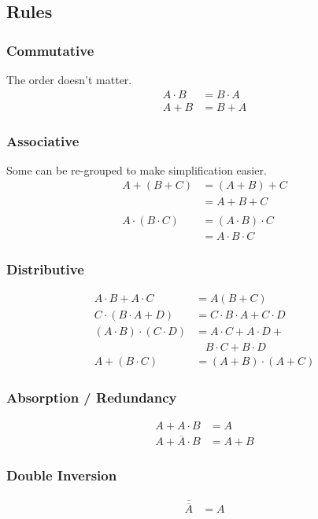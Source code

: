 \documentclass[a4paper,11pt, twocolumn]{article}
\begin{document}
\subsection{Rules}
\subsubsection{Commutative}
The order doesn't matter.\\
\begin{align*}
    A \cdot B &= B \cdot A\\
    A + B &= B + A
\end{align*}
\subsubsection{Associative}
Some can be re-grouped to make simplification easier.\\
\begin{align*}
    A+(B+C) &= (A+B)+C\\
    &= A+B+C\\ \\
    A\cdot (B\cdot C) &= (A\cdot B) \cdot C \\
    &= A \cdot B \cdot C
\end{align*}
\subsubsection{Distributive}
\begin{align*}
    A\cdot B + A\cdot C &= A(B+C)\\
    C\cdot (B\cdot A + D) &= C\cdot B\cdot A + C \cdot D\\
    (A\cdot B)\cdot (C\cdot D) &= A\cdot C + A\cdot D + \\
    & \ \ \ \ B\cdot C + B\cdot D\\
    A+(B\cdot C) &= (A+B)\cdot (A+C)
\end{align*}
\subsubsection{Absorption / Redundancy}
\begin{align*}
    A+A \cdot B &= A\\
    A+\overline{A} \cdot B &= A+B
\end{align*}
\subsubsection{Double Inversion}
\begin{align*}
    \overline{\overline{A}} &=A
\end{align*}
\end{document}
